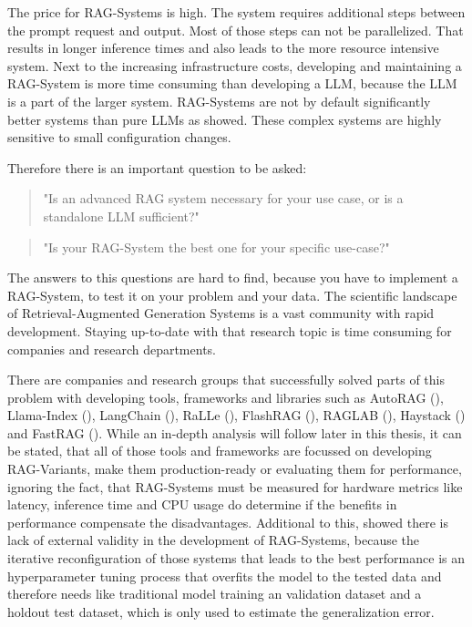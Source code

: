 The price for RAG-Systems is high. The system requires additional steps between the prompt request and output. Most of those steps can not be parallelized. That results in longer inference times and also leads to the more resource intensive system. Next to the increasing infrastructure costs, developing and maintaining a RAG-System is more time consuming than developing a LLM, because the LLM is a part of the larger system. RAG-Systems are not by default significantly better systems than pure LLMs as \citet{Simon.10112024} showed. These complex systems are highly sensitive to small configuration changes.

Therefore there is an important question to be asked: 
\begin{quotation}
    "Is an advanced RAG system necessary for your use case, or is a standalone LLM sufficient?"
\end{quotation}
\begin{quotation}
    "Is your RAG-System the best one for your specific use-case?"
\end{quotation}

The answers to this questions are hard to find, because you have to implement a RAG-System, to test it on your problem and your data. The scientific landscape of Retrieval-Augmented Generation Systems is a vast community with rapid development. Staying up-to-date with that research topic is time consuming for companies and research departments. 

There are companies and research groups that successfully solved parts of this problem with developing tools, frameworks and libraries such as AutoRAG (\citeyear{AutoRAG}), Llama-Index (\citeyear{Liu_LlamaIndex_2022}), LangChain (\citeyear{Chase_LangChain_2022}), RaLLe (\citeyear{ralle}), FlashRAG (\citeyear{FlashRAG}), RAGLAB (\citeyear{zhang-etal-2024-raglab}), Haystack (\citeyear{Pietsch_Haystack_the_end-to-end_2019}) and FastRAG (\citeyear{Izsak_fastRAG_Efficient_Retrieval_2023}). While an in-depth analysis will follow later in this thesis, it can be stated, that all of those tools and frameworks are focussed on developing RAG-Variants, make them production-ready or evaluating them for performance, ignoring the fact, that RAG-Systems must be measured for hardware metrics like latency, inference time and CPU usage do determine if the benefits in performance compensate the disadvantages. Additional to this, \citet{Simon.10112024} showed there is lack of external validity in the development of RAG-Systems, because the iterative reconfiguration of those systems that leads to the best performance is an hyperparameter tuning process that overfits the model to the tested data and therefore needs like traditional model training an validation dataset and a holdout test dataset, which is only used to estimate the generalization error.

